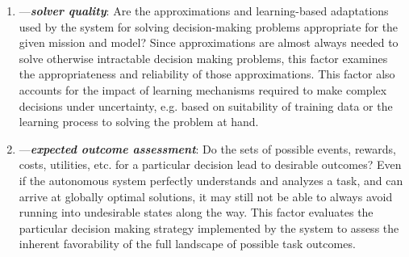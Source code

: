 \begin{enumerate}
%
\item \xQ---\textit{\textbf{solver quality}}: Are the approximations and learning-based adaptations used by the system for solving decision-making problems appropriate for the given mission and model? 
Since approximations are almost always needed to solve otherwise intractable decision making problems, this factor examines the appropriateness and reliability of those approximations. 
This factor also accounts for the impact of learning mechanisms required to make complex decisions under uncertainty, e.g. based on suitability of training data or the learning process to solving the problem at hand. 
%
\item \xO---\textit{\textbf{expected outcome assessment}}: Do the sets of possible events, rewards, costs, utilities, etc. for a particular decision lead to desirable outcomes? 
Even if the autonomous system perfectly understands and analyzes a task, and can arrive at globally optimal solutions, it may still not be able to always avoid running into undesirable states along the way. %
This factor evaluates the particular decision making strategy implemented by the system to assess the inherent favorability of the full landscape of possible task outcomes.  

\end{enumerate}
